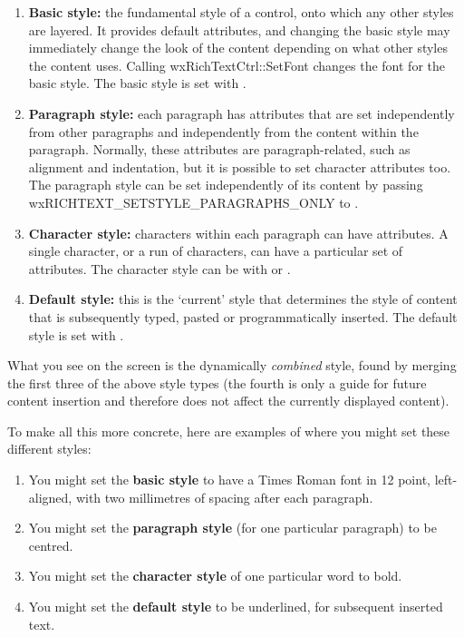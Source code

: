 \begin{enumerate}\itemsep=0pt
\item {\bf Basic style:} the fundamental style of a control, onto which any other
styles are layered. It provides default attributes, and changing the basic style
may immediately change the look of the content depending on what other styles
the content uses. Calling wxRichTextCtrl::SetFont changes the font for the basic style.
The basic style is set with .
\item {\bf Paragraph style:} each paragraph has attributes that are set independently
from other paragraphs and independently from the content within the paragraph.
Normally, these attributes are paragraph-related, such as alignment and indentation,
but it is possible to set character attributes too.
The paragraph style can be set independently of its content by passing wxRICHTEXT\_SETSTYLE\_PARAGRAPHS\_ONLY
to .
\item {\bf Character style:} characters within each paragraph can have attributes.
A single character, or a run of characters, can have a particular set of attributes.
The character style can be with  or 
.
\item {\bf Default style:} this is the `current' style that determines the
style of content that is subsequently typed, pasted or programmatically inserted.
The default style is set with .
\end{enumerate}

What you see on the screen is the dynamically {\it combined} style, found by merging
the first three of the above style types (the fourth is only a guide for future content
insertion and therefore does not affect the currently displayed content).

To make all this more concrete, here are examples of where you might set these different
styles:

\begin{enumerate}\itemsep=0pt
\item You might set the {\bf basic style} to have a Times Roman font in 12 point,
left-aligned, with two millimetres of spacing after each paragraph.
\item You might set the {\bf paragraph style} (for one particular paragraph) to
be centred.
\item You might set the {\bf character style} of one particular word to bold.
\item You might set the {\bf default style} to be underlined, for subsequent
inserted text.
\end{enumerate}

